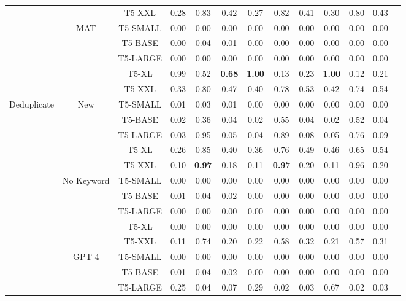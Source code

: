 \documentclass[twocolumn]{article}
\begin{document}
\begin{table}[ht!]
{\begin{tabular}{|c|c|c|ccc|ccc|ccc|c|}
& & T5-XXL  & 0.28 & 0.83 & 0.42  & 0.27 & 0.82 & 0.41  & 0.30 & 0.80 & 0.43  & \\
\cline{2-12}
&\multirow{5}{*}{\centering MAT} & T5-SMALL  & 0.00 & 0.00 & 0.00  & 0.00 & 0.00 & 0.00  & 0.00 & 0.00 & 0.00  & \\
& & T5-BASE  & 0.00 & 0.04 & 0.01  & 0.00 & 0.00 & 0.00  & 0.00 & 0.00 & 0.00  & \\
& & T5-LARGE  & 0.00 & 0.00 & 0.00  & 0.00 & 0.00 & 0.00  & 0.00 & 0.00 & 0.00  & \\
& & T5-XL  & 0.99 & 0.52 & \textbf{0.68}  & \textbf{1.00} & 0.13 & 0.23  & \textbf{1.00} & 0.12 & 0.21  & \\
& & T5-XXL  & 0.33 & 0.80 & 0.47  & 0.40 & 0.78 & 0.53  & 0.42 & 0.74 & 0.54  & \\
\hline
\multirow{25}{*}{\centering Deduplicate}&\multirow{5}{*}{\centering New} & T5-SMALL  & 0.01 & 0.03 & 0.01  & 0.00 & 0.00 & 0.00  & 0.00 & 0.00 & 0.00 &   \multirow{25}{*}{\centering 113} \\
& & T5-BASE  & 0.02 & 0.36 & 0.04  & 0.02 & 0.55 & 0.04  & 0.02 & 0.52 & 0.04  & \\
& & T5-LARGE  & 0.03 & 0.95 & 0.05  & 0.04 & 0.89 & 0.08  & 0.05 & 0.76 & 0.09  & \\
& & T5-XL  & 0.26 & 0.85 & 0.40  & 0.36 & 0.76 & 0.49  & 0.46 & 0.65 & 0.54  & \\
& & T5-XXL  & 0.10 & \textbf{0.97} & 0.18  & 0.11 & \textbf{0.97} & 0.20  & 0.11 & 0.96 & 0.20  & \\
\cline{2-12}
&\multirow{5}{*}{\centering No Keyword} & T5-SMALL  & 0.00 & 0.00 & 0.00  & 0.00 & 0.00 & 0.00  & 0.00 & 0.00 & 0.00  & \\
& & T5-BASE  & 0.01 & 0.04 & 0.02  & 0.00 & 0.00 & 0.00  & 0.00 & 0.00 & 0.00  & \\
& & T5-LARGE  & 0.00 & 0.00 & 0.00  & 0.00 & 0.00 & 0.00  & 0.00 & 0.00 & 0.00  & \\
& & T5-XL  & 0.00 & 0.00 & 0.00  & 0.00 & 0.00 & 0.00  & 0.00 & 0.00 & 0.00  & \\
& & T5-XXL  & 0.11 & 0.74 & 0.20  & 0.22 & 0.58 & 0.32  & 0.21 & 0.57 & 0.31  & \\
\cline{2-12}
&\multirow{5}{*}{\centering GPT 4} & T5-SMALL  & 0.00 & 0.00 & 0.00  & 0.00 & 0.00 & 0.00  & 0.00 & 0.00 & 0.00  & \\
& & T5-BASE  & 0.01 & 0.04 & 0.02  & 0.00 & 0.00 & 0.00  & 0.00 & 0.00 & 0.00  & \\
& & T5-LARGE  & 0.25 & 0.04 & 0.07  & 0.29 & 0.02 & 0.03  & 0.67 & 0.02 & 0.03  & \\

\end{tabular}}
\end{table}
\end{document}
